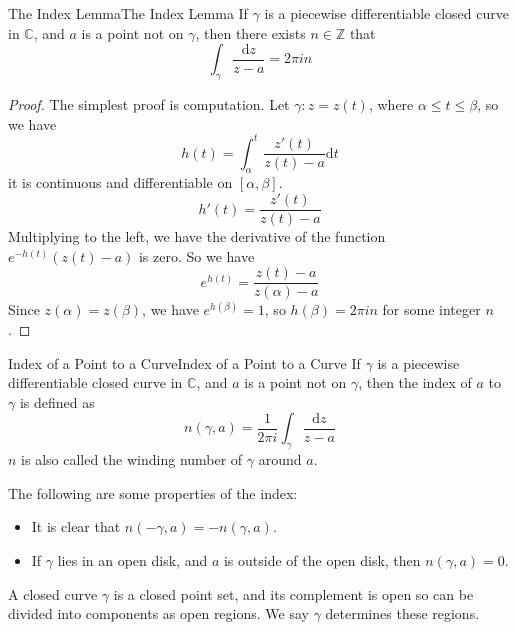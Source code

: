 \documentclass[../main.tex]{subfiles}
\begin{document}
\begin{lemma}{The Index Lemma}{The Index Lemma}
	If $\gamma$ is a piecewise differentiable closed curve in $\mathbb{C}$, and $a$ is a point not on $\gamma$, then there exists $n\in \mathbb{Z}$ that
	\begin{equation}
		\int_{\gamma} \frac{\mathrm{d} z}{z-a} = 2 \pi i n
	\end{equation}
\end{lemma}
\begin{proof}
The simplest proof is computation. Let $\gamma:z=z(t)$, where $\alpha\leq t\leq \beta$, so we have
\begin{equation*}
h(t) = \int_{\alpha}^t \frac{z'(t)}{z(t)-a} \mathrm{d} t
\end{equation*}
it is continuous and differentiable on $[\alpha,\beta]$.
\begin{equation*}
	h'(t) = \frac{z'(t)}{z(t)-a}
\end{equation*}
Multiplying to the left, we have the derivative of the function $e^{-h(t)}(z(t)-a)$ is zero. So we have
\begin{equation*}
	e^{h(t)} = \frac{z(t)-a}{z(\alpha)-a}
\end{equation*}
Since $z(\alpha)=z(\beta)$, we have $e^{h(\beta)} = 1$, so $h(\beta) = 2 \pi i n$ for some integer $n$.
\end{proof}

\begin{definition}{Index of a Point to a Curve}{Index of a Point to a Curve}
	If $\gamma$ is a piecewise differentiable closed curve in $\mathbb{C}$, and $a$ is a point not on $\gamma$, then the index of $a$ to $\gamma$ is defined as
	\begin{equation}
		n(\gamma,a) = \frac{1}{2\pi i} \int_{\gamma} \frac{\mathrm{d} z}{z-a}
	\end{equation}
	$n$ is also called the winding number of $\gamma$ around $a$.
\end{definition}

The following are some properties of the index:
\begin{itemize}
\item It is clear that $n(-\gamma,a) = -n(\gamma,a)$.
\item If $\gamma$ lies in an open disk, and $a$ is outside of the open disk, then $n(\gamma,a) = 0$.
\end{itemize}

A closed curve $\gamma$ is a closed point set, and its complement is open so can be divided into components as open regions. We say $\gamma$ determines these regions.
\end{document}
